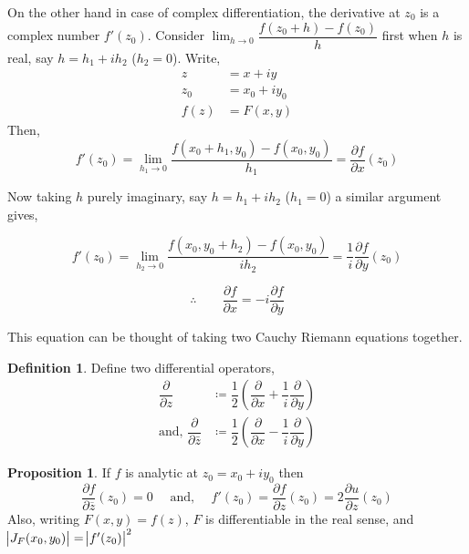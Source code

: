 \documentclass[12pt]{article}
\theoremstyle{definition}
\newtheorem{defn}{Definition}
\newtheorem{prop}{Proposition}
\newenvironment{definition}{
\begin{tcolorbox}[colback=green!5!white,colframe=green!75!black, parbox = false]\begin{defn} }{\end{defn}\end{tcolorbox} }
\newenvironment{proposition}{
\begin{tcolorbox}[colback=green!5!white,colframe=green!75!black, parbox = false]\begin{prop} }{\end{prop}\end{tcolorbox} }
\begin{document}
On the other hand in case of complex differentiation, the derivative at $z_0$ is a complex number $f'(z_0)$. Consider $\displaystyle \lim_{h\to 0}\dfrac{f(z_0+h)-f(z_0)}{h}$ first when $h$ is real, say $h=h_1+i h_2$ ($h_2=0$). Write,
\begin{align*}
    z&=x+i y\\
    z_0&=x_0+i y_0\\
    f(z)&=F(x,y)
\end{align*}
Then,
\begin{equation*}
    f'(z_0)=\lim_{h_1\to 0}\dfrac{f(x_0+h_1,y_0)-f(x_0,y_0)}{h_1}=\dfrac{\partial f}{\partial x}(z_0) 
\end{equation*}

Now taking $h$ purely imaginary, say $h=h_1+i h_2$ ($h_1=0$) a similar argument gives,

$$f'(z_0)
=\lim_{h_2\to 0} \dfrac{f(x_0,y_0+h_2)-f(x_0,y_0)}{ih_2}
=\dfrac{1}{i}\dfrac{\partial f}{\partial y}(z_0)$$

\begin{equation}
    \therefore \qquad \dfrac{\partial f}{\partial x}=-i \dfrac{\partial f}{\partial y}    
\end{equation}

This equation can be thought of taking two Cauchy Riemann equations together.

\begin{definition}
    Define two differential operators,
    \begin{align*}
    \dfrac{\partial}{\partial z}&\coloneqq\dfrac{1}{2}\left( \dfrac{\partial}{\partial x} + \dfrac{1}{i}\dfrac{\partial}{\partial y} \right)\\
    \text{and, }\dfrac{\partial}{\partial \bar{z}}&\coloneqq\dfrac{1}{2}\left( \dfrac{\partial}{\partial x} - \dfrac{1}{i}\dfrac{\partial}{\partial y} \right)
    \end{align*}
\end{definition}


\begin{proposition}
If $f$ is analytic at $z_0=x_0+i y_0$ then 
\begin{equation*}
    \dfrac{\partial f}{\partial \overline{z}}(z_0)=0\quad\text{ and, }\quad f'(z_0)=\dfrac{\partial f}{\partial z}(z_0)=2 \dfrac{\partial u}{\partial z}(z_0)
\end{equation*}
Also, writing $F(x,y)=f(z)$, $F$ is differentiable in the real sense, and $\abs{J_F(x_0,y_0)}=\abs{f'(z_0)}^2$
\end{proposition}
\end{document}
